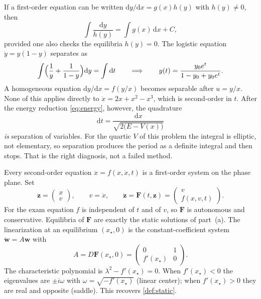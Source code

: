 \documentclass[11pt,a4paper]{article}
\begin{document}
\begin{example}
\label{ex:sep-var}
If a first-order equation can be written \(\mathrm{d}y/\mathrm{d}x=g(x)h(y)\) with \(h(y)\neq 0\), then
\[
\int\frac{\mathrm{d}y}{h(y)}
=
\int g(x)\,\mathrm{d}x+C,
\]
provided one also checks the equilibria \(h(y)=0\). The logistic equation \(\dot y=y(1-y)\) separates as
\[
\int\Bigl(\frac{1}{y}+\frac{1}{1-y}\Bigr)\mathrm{d}y
=
\int\mathrm{d}t
\qquad\Longrightarrow\qquad
y(t)
=
\frac{y_0 e^{t}}{1-y_0+y_0 e^{t}}.
\]
A homogeneous equation \(\mathrm{d}y/\mathrm{d}x=f(y/x)\) becomes separable after \(u=y/x\). None of this applies directly to \(\ddot x=2x+x^{2}-x^{3}\), which is second-order in \(t\). After the energy reduction \eqref{eq:energy}, however, the quadrature
\[
\mathrm{d}t
=
\frac{\mathrm{d}x}{\sqrt{2\bigl(E-V(x)\bigr)}}
\]
\emph{is} separation of variables. For the quartic \(V\) of this problem the integral is elliptic, not elementary, so separation produces the period as a definite integral and then stops. That is the right diagnosis, not a failed method.
\end{example}

\begin{definition}
\label{def:companion}
Every second-order equation \(\ddot x=f(x,\dot x,t)\) is a first-order system on the phase plane. Set
\[
\mathbf{z}
=
\begin{pmatrix} x \\ v \end{pmatrix},
\qquad
v=\dot x,
\qquad
\dot{\mathbf{z}}
=
\mathbf{F}(t,\mathbf{z})
=
\begin{pmatrix} v \\ f(x,v,t) \end{pmatrix}.
\]
For the exam equation \(f\) is independent of \(t\) and of \(v\), so \(\mathbf{F}\) is autonomous and conservative. Equilibria of \(\mathbf{F}\) are exactly the static solutions of part~(a). The linearization at an equilibrium \((x_{\star},0)\) is the constant-coefficient system \(\dot{\mathbf{w}}=A\mathbf{w}\) with
\[
A
=
D\mathbf{F}(x_{\star},0)
=
\begin{pmatrix}
0 & 1 \\
f'(x_{\star}) & 0
\end{pmatrix}.
\]
The characteristic polynomial is \(\lambda^{2}-f'(x_{\star})=0\). When \(f'(x_{\star})<0\) the eigenvalues are \(\pm i\omega\) with \(\omega=\sqrt{-f'(x_{\star})}\) (linear center); when \(f'(x_{\star})>0\) they are real and opposite (saddle). This recovers \cref{def:static}.
\end{definition}
\end{document}

